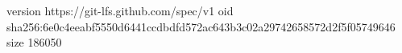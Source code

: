 version https://git-lfs.github.com/spec/v1
oid sha256:6e0c4eeabf5550d6441ccdbdfd572ac643b3c02a29742658572d2f5f05749646
size 186050
